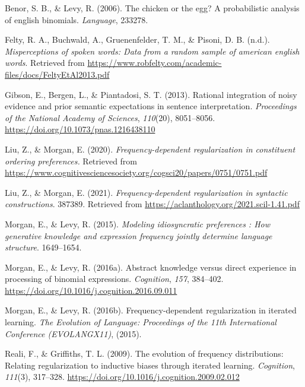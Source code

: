 \documentclass[
  jou,floatsintext]{apa6}
\newlength{\cslhangindent}
\newenvironment{CSLReferences}[2] %
 {\begin{list}{}{%
  \setlength{\itemindent}{0pt}
  \setlength{\leftmargin}{0pt}
  \setlength{\parsep}{0pt}
  \ifodd #1
   \setlength{\leftmargin}{\cslhangindent}
   \setlength{\itemindent}{-1\cslhangindent}
  \fi
  \setlength{\itemsep}{#2\baselineskip}}}
 {\end{list}}
\begin{document}
\label{refs}
\begin{CSLReferences}{1}{0}
Benor, S. B., \& Levy, R. (2006). The chicken or the egg? A probabilistic analysis of english binomials. \emph{Language}, 233278.

Felty, R. A., Buchwald, A., Gruenenfelder, T. M., \& Pisoni, D. B. (n.d.). \emph{Misperceptions of spoken words: Data from a random sample of american english words}. Retrieved from \url{https://www.robfelty.com/academic-files/docs/FeltyEtAl2013.pdf}

Gibson, E., Bergen, L., \& Piantadosi, S. T. (2013). Rational integration of noisy evidence and prior semantic expectations in sentence interpretation. \emph{Proceedings of the National Academy of Sciences}, \emph{110}(20), 8051--8056. \url{https://doi.org/10.1073/pnas.1216438110}

Liu, Z., \& Morgan, E. (2020). \emph{Frequency-dependent regularization in constituent ordering preferences.} Retrieved from \url{https://www.cognitivesciencesociety.org/cogsci20/papers/0751/0751.pdf}

Liu, Z., \& Morgan, E. (2021). \emph{Frequency-dependent regularization in syntactic constructions}. 387389. Retrieved from \url{https://aclanthology.org/2021.scil-1.41.pdf}

Morgan, E., \& Levy, R. (2015). \emph{Modeling idiosyncratic preferences : How generative knowledge and expression frequency jointly determine language structure}. 1649--1654.

Morgan, E., \& Levy, R. (2016a). Abstract knowledge versus direct experience in processing of binomial expressions. \emph{Cognition}, \emph{157}, 384--402. \url{https://doi.org/10.1016/j.cognition.2016.09.011}

Morgan, E., \& Levy, R. (2016b). Frequency-dependent regularization in iterated learning. \emph{The Evolution of Language: Proceedings of the 11th International Conference (EVOLANGX11)}, (2015).

Reali, F., \& Griffiths, T. L. (2009). The evolution of frequency distributions: Relating regularization to inductive biases through iterated learning. \emph{Cognition}, \emph{111}(3), 317--328. \url{https://doi.org/10.1016/j.cognition.2009.02.012}

\end{CSLReferences}
\end{document}
